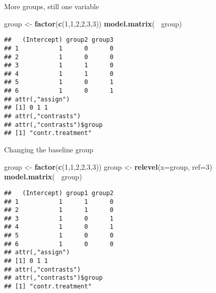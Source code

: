 \documentclass[
  ignorenonframetext,
]{beamer}
\newenvironment{Shaded}{\begin{snugshade}}{\end{snugshade}}
\newcommand{\DataTypeTok}[1]{\textcolor[rgb]{0.13,0.29,0.53}{#1}}
\newcommand{\DecValTok}[1]{\textcolor[rgb]{0.00,0.00,0.81}{#1}}
\newcommand{\KeywordTok}[1]{\textcolor[rgb]{0.13,0.29,0.53}{\textbf{#1}}}
\newcommand{\NormalTok}[1]{#1}
\newcommand{\OperatorTok}[1]{\textcolor[rgb]{0.81,0.36,0.00}{\textbf{#1}}}
\newcommand{\StringTok}[1]{\textcolor[rgb]{0.31,0.60,0.02}{#1}}
\begin{document}
\begin{frame}[fragile]{More groups, still one variable}
\protect\hypertarget{more-groups-still-one-variable}{}

\begin{Shaded}
\begin{Highlighting}[]
\NormalTok{group <-}\StringTok{ }\KeywordTok{factor}\NormalTok{(}\KeywordTok{c}\NormalTok{(}\DecValTok{1}\NormalTok{,}\DecValTok{1}\NormalTok{,}\DecValTok{2}\NormalTok{,}\DecValTok{2}\NormalTok{,}\DecValTok{3}\NormalTok{,}\DecValTok{3}\NormalTok{))}
\KeywordTok{model.matrix}\NormalTok{(}\OperatorTok{~}\StringTok{ }\NormalTok{group)}
\end{Highlighting}
\end{Shaded}

\begin{verbatim}
##   (Intercept) group2 group3
## 1           1      0      0
## 2           1      0      0
## 3           1      1      0
## 4           1      1      0
## 5           1      0      1
## 6           1      0      1
## attr(,"assign")
## [1] 0 1 1
## attr(,"contrasts")
## attr(,"contrasts")$group
## [1] "contr.treatment"
\end{verbatim}

\end{frame}

\begin{frame}[fragile]{Changing the baseline group}
\protect\hypertarget{changing-the-baseline-group}{}

\begin{Shaded}
\begin{Highlighting}[]
\NormalTok{group <-}\StringTok{ }\KeywordTok{factor}\NormalTok{(}\KeywordTok{c}\NormalTok{(}\DecValTok{1}\NormalTok{,}\DecValTok{1}\NormalTok{,}\DecValTok{2}\NormalTok{,}\DecValTok{2}\NormalTok{,}\DecValTok{3}\NormalTok{,}\DecValTok{3}\NormalTok{))}
\NormalTok{group <-}\StringTok{ }\KeywordTok{relevel}\NormalTok{(}\DataTypeTok{x=}\NormalTok{group, }\DataTypeTok{ref=}\DecValTok{3}\NormalTok{)}
\KeywordTok{model.matrix}\NormalTok{(}\OperatorTok{~}\StringTok{ }\NormalTok{group)}
\end{Highlighting}
\end{Shaded}

\begin{verbatim}
##   (Intercept) group1 group2
## 1           1      1      0
## 2           1      1      0
## 3           1      0      1
## 4           1      0      1
## 5           1      0      0
## 6           1      0      0
## attr(,"assign")
## [1] 0 1 1
## attr(,"contrasts")
## attr(,"contrasts")$group
## [1] "contr.treatment"
\end{verbatim}

\end{frame}
\end{document}
